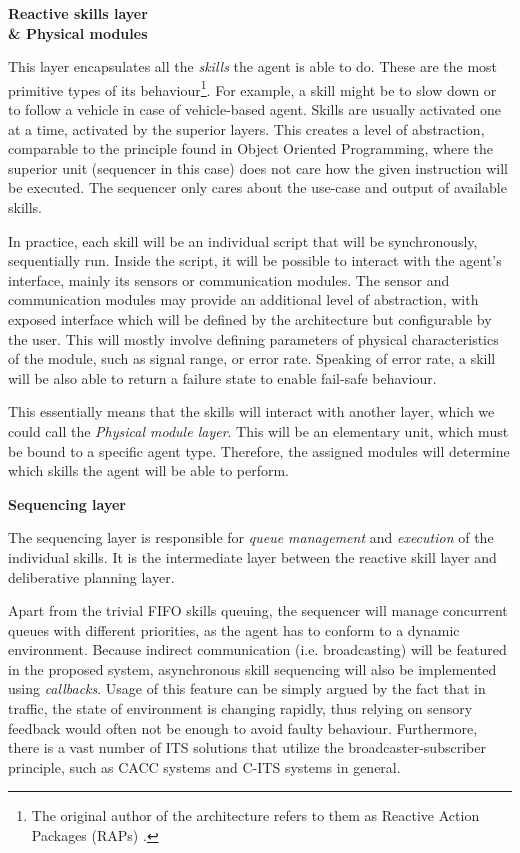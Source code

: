 \documentclass[main.tex]{subfiles}
\begin{document}
\textbf{Reactive skills layer \\\& Physical modules}

This layer encapsulates all the \emph{skills} the agent is able to do. These are the 
most primitive types of its behaviour\footnote{The original author of the architecture refers to them 
as Reactive Action Packages (RAPs) \cite{Firby1987}.}. For example, a skill might be to slow
down or to follow a vehicle in case of vehicle-based agent. Skills are usually activated one at a time, 
activated by the superior layers. This creates a level of abstraction, comparable to the principle found 
in Object Oriented Programming, where the superior unit (sequencer in this case) does not care how the 
given instruction will be executed. The sequencer only cares about the use-case and output of available
skills. 

In practice, each skill will be an individual script that will be synchronously, sequentially run. Inside 
the script, it will be possible to interact with the agent's interface, mainly its sensors or communication 
modules. The sensor and communication modules may provide an additional level of abstraction,
with exposed interface which will be defined by the architecture but configurable by the user.
This will mostly involve defining parameters of physical characteristics of the module, such 
as signal range, or error rate. Speaking of error rate, a skill will be also able to return a 
failure state to enable fail-safe behaviour. 

This essentially means that the skills will interact with another layer, which we could call the
\emph{Physical module layer}. This will be an elementary unit, which must be bound to a specific agent type. 
Therefore, the assigned modules will determine which skills the agent will be able to perform.  

\textbf{Sequencing layer}

The sequencing layer is responsible for \emph{queue management} and \emph{execution} of the individual skills. It is the 
intermediate layer between the reactive skill layer and deliberative planning layer. 

Apart from the trivial FIFO skills queuing, the sequencer will manage concurrent queues with different 
priorities, as the agent has to conform to a dynamic environment. Because indirect communication (i.e. 
broadcasting) will be featured in the proposed system, asynchronous skill sequencing will also be 
implemented using \emph{callbacks}. Usage of this feature can be simply argued by the fact that in traffic, 
the state of environment is changing rapidly, thus relying on sensory feedback would often not be enough 
to avoid faulty behaviour. Furthermore, there is a vast number of ITS solutions that utilize the 
broadcaster-subscriber principle, such as CACC systems and C-ITS systems in general.
\end{document}
